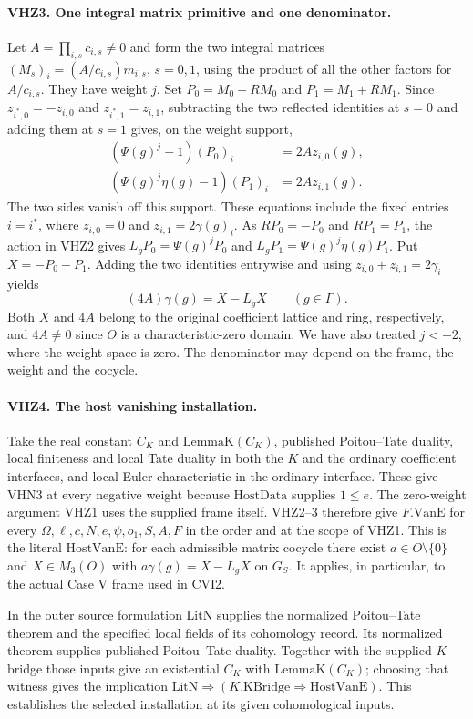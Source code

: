 \paragraph{VHZ3. One integral matrix primitive and one denominator.}
\label{claim:VHZ3}
Let $A=\prod_{i,s}c_{i,s}\ne0$ and form the two integral matrices
$(M_s)_i=(A/c_{i,s})m_{i,s}$, $s=0,1$, using the product of all
the other factors for $A/c_{i,s}$. They have weight $j$.
Set $P_0=M_0-RM_0$ and $P_1=M_1+RM_1$. Since $z_{i^*,0}=-z_{i,0}$
and $z_{i^*,1}=z_{i,1}$, subtracting the two reflected identities
at $s=0$ and adding them at $s=1$ gives, on the weight support,
\[
 \begin{aligned}
 (\Psi(g)^j-1)(P_0)_i&=2A z_{i,0}(g),\\
 (\Psi(g)^j\eta(g)-1)(P_1)_i&=2A z_{i,1}(g).
 \end{aligned}
\]
The two sides vanish off this support. These equations include the
fixed entries $i=i^*$, where $z_{i,0}=0$ and
$z_{i,1}=2\gamma(g)_i$. As $RP_0=-P_0$ and $RP_1=P_1$, the
action in VHZ2 gives $L_gP_0=\Psi(g)^jP_0$ and
$L_gP_1=\Psi(g)^j\eta(g)P_1$. Put $X=-P_0-P_1$. Adding the two
identities entrywise and using $z_{i,0}+z_{i,1}=2\gamma_i$ yields
\[
                 (4A)\gamma(g)=X-L_gX\qquad(g\in\Gamma).
\]
Both $X$ and $4A$ belong to the original coefficient lattice and
ring, respectively, and $4A\ne0$ since $O$ is a characteristic-zero
domain. We have also treated $j<-2$, where the weight space is zero.
The denominator may depend on the frame, the weight and the cocycle.

\paragraph{VHZ4. The host vanishing installation.}
\label{claim:VHZ4}
Take the real constant $C_K$ and $\mathrm{LemmaK}(C_K)$, published
Poitou--Tate duality, local finiteness and local Tate duality in
both the $K$ and the ordinary coefficient interfaces, and local
Euler characteristic in the ordinary interface. These give VHN3
at every negative weight because $\mathrm{HostData}$ supplies
$1\le e$. The zero-weight argument VHZ1 uses the supplied frame
itself. VHZ2--3 therefore give $F.\mathrm{VanE}$ for every
$\Omega,\ell,c,N,e,\psi,o_1,S,A,F$ in the order and at the scope
of VHZ1. This is the literal $\mathrm{HostVanE}$:
for each admissible matrix cocycle there exist
$a\in O\setminus\{0\}$ and $X\in M_3(O)$ with
$a\gamma(g)=X-L_gX$ on $G_S$. It applies, in particular, to the
actual Case V frame used in CVI2.

In the outer source formulation $\mathrm{LitN}$ supplies the
normalized Poitou--Tate theorem and the specified local fields of
its cohomology record. Its normalized theorem supplies published
Poitou--Tate duality. Together with the supplied $K$-bridge those
inputs give an existential $C_K$ with $\mathrm{LemmaK}(C_K)$;
choosing that witness gives the implication
$\mathrm{LitN}\Rightarrow (K.\mathrm{KBridge}\Rightarrow
\mathrm{HostVanE})$. This establishes the selected installation
at its given cohomological inputs.
